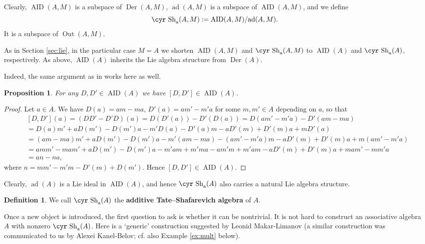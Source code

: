 \documentclass[11pt,reqno]{amsart}
\numberwithin{equation}{section}
\newtheorem{prop}[theorem]{Proposition}
\theoremstyle{definition}
\newtheorem{definition}[theorem]{Definition}
\newcommand{\Out}{{\operatorname{ Out}}}
\newcommand{\AID}{{\operatorname{ AID}}}
\newcommand{\Der}{{\operatorname{ Der}}}
\newcommand{\ad}{{\operatorname{ ad}}}
\def\Sha{\text{\cyr Sh}}
\begin{document}
Clearly, $\AID (A,M)$ is a subspace of $\Der (A,M)$, $\ad (A,M)$ is a subspace of $\AID (A,M)$,
and we define
$$
\Sha_{\text{\rm{a}}} (A,M):=\AID (A,M)/\ad (A,M).
$$
It is a subspace of $\Out (A,M)$.

As in Section \ref{sec:lie}, in the particular case $M=A$ we shorten $\AID (A,M)$ and $\Sha_{\text{\rm{a}}} (A,M)$ to
$\AID (A)$ and $\Sha_{\text{\rm{a}}} (A)$, respectively. As above, $\AID(A)$ inherits the Lie algebra structure from
$\Der (A)$.

Indeed, the same argument as in \cite[Proof of Proposition 2.3]{BDV1} works here as well.

\begin{prop}
For any $D,D'\in \AID (A)$ we have $[D,D']\in \AID (A)$.
\end{prop}
\begin{proof}
Let $a\in A$.
We have $D(a)=am-ma$, $D'(a)=am'-m'a$ for some $m,m'\in A$ depending on $a$, so that
{\footnotesize{
$$
\begin{aligned}
& [D,D'](a)  =(DD'-D'D)(a)=D(D'(a))-D'(D(a))=D(am'-m'a)-D'(am-ma)\\
          & = D(a)m'+aD(m')-D(m')a-m'D(a)-D'(a)m-aD'(m)+D'(m)a+mD'(a)\\
          & =(am-ma)m'+aD(m')-D(m')a-m'(am-ma)-(am'-m'a)m-aD'(m)+D'(m)a+m(am'-m'a)\\
          & =amm'-mam'+aD(m')-D(m')a-m'am+m'ma-am'm+m'am-aD'(m)+D'(m)a+mam'-mm'a \\
          & =an-na,
\end{aligned}
$$
}}
where $n=mm'-m'm-D'(m)+D(m')$. Hence $[D,D']\in \AID (A)$.
\end{proof}

Clearly,
$\ad (A)$ is a Lie ideal in $\AID (A)$, and hence
$\Sha_{\text{\rm{a}}}(A)$ also carries a natural Lie algebra structure.

\begin{definition} \label{def:sha-add}
We call $\Sha_{\text{\rm{a}}}(A)$ the {\bf {additive Tate--Shafarevich algebra}} of $A$.
\end{definition}



Once a new object is introduced, the first question to ask is whether it can be nontrivial.
It is not hard to construct an associative algebra $A$ with nonzero $\Sha_{\text{\rm{a}}}(A)$.
Here is a `generic' construction suggested by Leonid Makar-Limanov (a similar construction was
communicated to us by Alexei Kanel-Belov; cf. also Example \ref{ex:mult} below).
\end{document}
